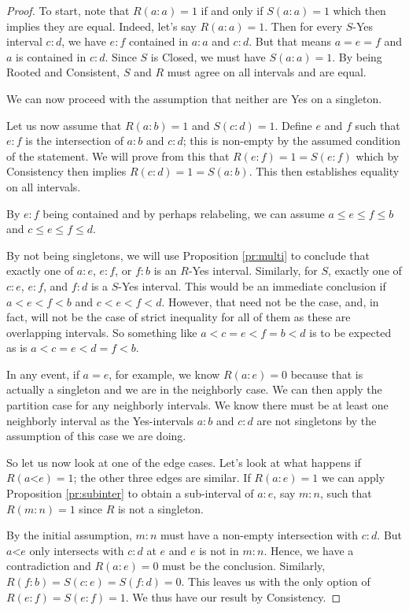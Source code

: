 \documentclass[12pt]{article}
\theoremstyle{remark}
\newcommand{\lt}{\mathord{<}}
\begin{document}
\begin{proof}
To start, note that $R(a:a) = 1$ if and only if $S(a:a) = 1$ which then implies they are equal. Indeed, let's say $R(a:a) =1$. Then for every $S$-Yes interval $c:d$, we have $e:f$ contained in $a:a$ and $c:d$. But that means $a=e=f$ and $a$ is contained in $c:d$. Since $S$ is Closed, we must have $S(a:a)=1$. By being Rooted and Consistent, $S$ and $R$ must agree on all intervals and are equal. 

We can now proceed with the assumption that neither are Yes on a singleton.

Let us now assume that $R(a:b) = 1$ and $S(c:d) = 1$. Define $e$ and $f$ such that $e:f$ is the intersection of $a:b$ and $c:d$; this is non-empty by the assumed condition of the statement. We will prove from this that $R(e:f)=1 = S(e:f)$ which by Consistency then implies $R(c:d) = 1 = S(a:b)$. This then establishes equality on all intervals. 

By $e:f$ being contained and by perhaps relabeling, we can assume $a \leq e \leq f \leq b$ and $c \leq e \leq f \leq d$. 

By not being singletons, we will use Proposition \ref{pr:multi} to conclude that exactly one of $a:e$, $e:f$, or $f:b$ is an $R$-Yes interval. Similarly, for $S$, exactly one of $c:e$, $e:f$, and $f:d$ is a $S$-Yes interval. This would be an immediate conclusion if $a < e < f < b$ and $c < e < f < d$. However, that need not be the case, and, in fact, will not be the case of strict inequality for all of them as these are overlapping intervals. So something like $a < c = e < f = b < d$ is to be expected as is $a < c = e < d = f < b$. 

In any event, if $a=e$, for example, we know $R(a:e) = 0$ because that is actually a singleton and we are in the neighborly case. We can then apply the partition case for any neighborly intervals. We know there must be at least one neighborly interval as the Yes-intervals $a:b$ and $c:d$ are not singletons by the assumption of this case we are doing. 

So let us now look at one of the edge cases. Let's look at what happens if $R(a\lt e) = 1$; the other three edges are similar. If $R(a:e) =1$ we can apply Proposition \ref{pr:subinter} to obtain a sub-interval of $a:e$, say $m:n$, such that $R(m:n) = 1$ since $R$ is not a singleton. 

By the initial assumption, $m:n$ must have a non-empty intersection with $c:d$. But $a\lt e$ only intersects with $c:d$ at $e$ and $e$ is not in $m:n$. Hence, we have a contradiction and $R(a:e)=0$ must be the conclusion. Similarly, $R(f:b) = S(c:e) = S(f:d) = 0$. This leaves us with the only option of $R(e:f) = S(e:f) = 1$. We thus have our result by Consistency.  

\end{proof}
\end{document}
